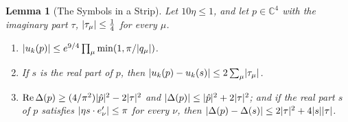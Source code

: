 \documentclass[11pt]{preprint}
\DeclarePairedDelimiter{\abs}{\lvert}{\rvert}
\numberwithin{equation}{section}
\newtheorem{lemma}[theorem]{Lemma}
\theoremstyle{definition}
\theoremstyle{remark}
\theoremstyle{plain}
\begin{document}
\begin{lemma}[The Symbols in a Strip]\label{lem:strip}
Let $10\eta \leq 1$, and let $p \in \mathbb C^4$ with the imaginary part $\tau$, $\abs{\tau_\mu} \leq \frac14$ for every $\mu$.
\begin{enumerate}[label=(\roman*)]
\item $\abs{u_k(p)} \leq e^{9/4}\prod_\mu\min(1, \pi/\abs{q_\mu})$.
\item If $s$ is the real part of $p$, then $\abs{u_k(p) - u_k(s)} \leq 2\sum_\mu\abs{\tau_\mu}$.
\item $\operatorname{Re}\Delta(p) \geq (4/\pi^2)\abs{\hat p}^2 - 2\abs{\tau}^2$ and $\abs{\Delta(p)} \leq \abs{\hat p}^2 + 2\abs{\tau}^2$; and if the real part $s$ of $p$ satisfies $\abs{\eta s \cdot e'_\nu} \leq \pi$ for every $\nu$, then $\abs{\Delta(p) - \Delta(s)} \leq 2\abs{\tau}^2 + 4\abs{s}\abs{\tau}$.
\end{enumerate}
\end{lemma}
\end{document}
